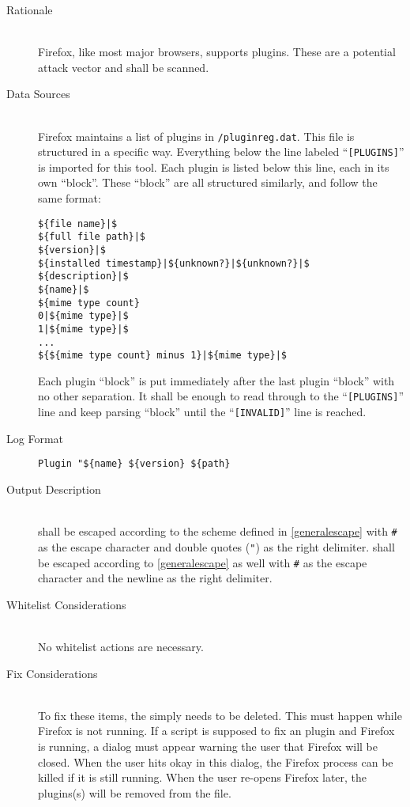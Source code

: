 \begin{description}
\item[Rationale] \hfill \\
Firefox, like most major browsers, supports plugins.  These are a potential
attack vector and shall be scanned.  
\item[Data Sources] \hfill \\
Firefox maintains a list of plugins in \texttt{/pluginreg.dat}.
This file is structured in a specific way.  Everything below the line labeled
``\texttt{[PLUGINS]}'' is imported for this tool.  Each plugin is listed below
this line, each in its own ``block''.  These ``block'' are all structured
similarly, and follow the same format:
\begin{verbatim}
${file name}|$
${full file path}|$
${version}|$
${installed timestamp}|${unknown?}|${unknown?}|$
${description}|$
${name}|$
${mime type count}
0|${mime type}|$
1|${mime type}|$
...
${${mime type count} minus 1}|${mime type}|$
\end{verbatim}
Each plugin ``block'' is put immediately after the last plugin ``block'' with no
other separation.  It shall be enough to read through to the
``\texttt{[PLUGINS]}'' line and keep parsing ``block'' until the
``\texttt{[INVALID]}'' line is reached.
\item[Log Format] \hfill 
\vspace{-\baselineskip}
\begin{verbatim}
Plugin "${name} ${version} ${path}
\end{verbatim}
\item[Output Description] \hfill \\
 shall be escaped according to the scheme
defined in \ref{generalescape} with \verb|#| as the escape character and double
quotes (\verb|"|) as the right delimiter.   shall be escaped
according to \ref{generalescape} as well with \verb|#| as the escape character
and the newline as the right delimiter.  
\item[Whitelist Considerations] \hfill \\
No whitelist actions are necessary.  
\item[Fix Considerations] \hfill \\
To fix these items, the  simply needs to be deleted.  This must
happen while Firefox is not running.  If a script is supposed to fix an
plugin and Firefox is running, a dialog must appear warning the user that
Firefox will be closed.  When the user hits okay in this dialog, the Firefox
process can be killed if it is still running.  When the user re-opens Firefox
later, the plugins(s) will be removed from the file.
\end{description}

